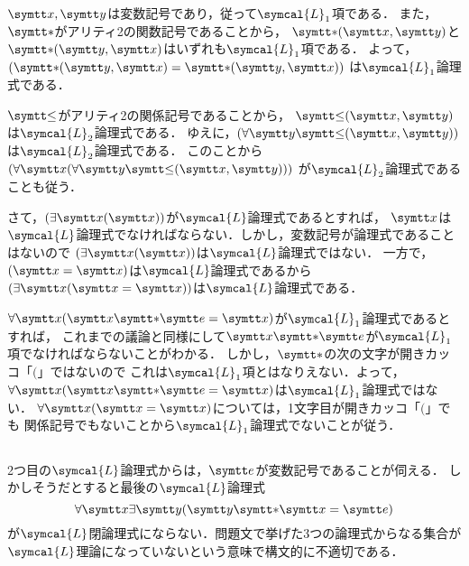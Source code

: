 \(\obj{x}, \obj{y}\)は変数記号であり，従って\(\symcal{L}_1\)項である．
また，\(\obj{\ast}\)がアリティ2の関数記号であることから，
\(\apply{\mathord{\obj{\ast}}}{\obj{x}, \obj{y}}\)と
\(\apply{\mathord{\obj{\ast}}}{\obj{y}, \obj{x}}\)はいずれも\(\symcal{L}_1\)項である．
よって，
\(\paren{\apply{\mathord{\obj{\ast}}}{\obj{y}, \obj{x}} = \apply{\mathord{\obj{\ast}}}{\obj{y}, \obj{x}}}\)
は\(\symcal{L}_1\)論理式である．

\(\obj{\leq}\)がアリティ2の関係記号であることから，
\(\apply{\mathord{\obj{\leq}}}{\obj{x}, \obj{y}}\)は\(\symcal{L}_2\)論理式である．
ゆえに，\(\paren{\forall \obj{y}\apply{\mathord{\obj{\leq}}}{\obj{x}, \obj{y}}}\)
は\(\symcal{L}_2\)論理式である．
このことから\(\paren{\forall \obj{x}\paren{\forall \obj{y}\apply{\mathord{\obj{\leq}}}{\obj{x}, \obj{y}}}}\)
が\(\symcal{L}_2\)論理式であることも従う．

さて，\(\paren{\apply{\exists \obj{x}}{\obj{x}}}\)が\(\symcal{L}\)論理式であるとすれば，
\(\obj{x}\)は\(\symcal{L}\)論理式でなければならない．しかし，変数記号が論理式であることはないので
\(\paren{\apply{\exists \obj{x}}{\obj{x}}}\)は\(\symcal{L}\)論理式ではない．
一方で，\(\paren{\obj{x} = \obj{x}}\)は\(\symcal{L}\)論理式であるから
\(\paren{\apply{\exists \obj{x}}{\obj{x} = \obj{x}}}\)は\(\symcal{L}\)論理式である．

\(\apply{\forall \obj{x}}{\obj{x} \obj{\ast} \obj{e} = \obj{x}}\)が\(\symcal{L}_1\)論理式であるとすれば，
これまでの議論と同様にして\(\obj{x} \obj{\ast} \obj{e}\)が\(\symcal{L}_1\)項でなければならないことがわかる．
しかし，\(\obj{\ast}\)の次の文字が開きカッコ「\(\lparen\)」ではないので
これは\(\symcal{L}_1\)項とはなりえない．よって，
\(\apply{\forall \obj{x}}{\obj{x} \obj{\ast} \obj{e} = \obj{x}}\)は\(\symcal{L}_1\)論理式ではない．
\(\apply{\forall \obj{x}}{\obj{x} = \obj{x}}\)については，1文字目が開きカッコ「\(\lparen\)」でも
関係記号でもないことから\(\symcal{L}_1\)論理式でないことが従う．

\subsection*{}

2つ目の\(\symcal{L}\)論理式からは，\(\obj{e}\)が変数記号であることが伺える．
しかしそうだとすると最後の\(\symcal{L}\)論理式
\[
	\forall \obj{x} \exists \obj{y} \paren{\obj{y} \obj{\ast} \obj{x} = \obj{e}}
\]
が\(\symcal{L}\)閉論理式にならない．問題文で挙げた3つの論理式からなる集合が
\(\symcal{L}\)理論になっていないという意味で構文的に不適切である．

